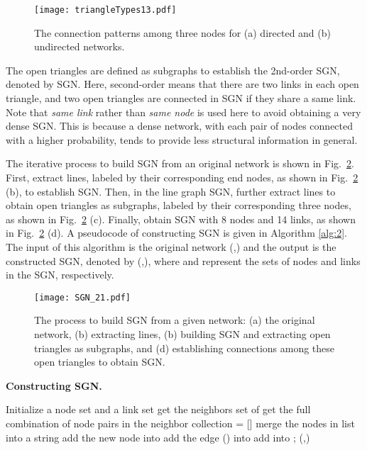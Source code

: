 \documentclass[10pt,journal,compsoc]{IEEEtran}
\begin{document}
\begin{figure}[!t]
	\centering
	\texttt{[image: triangleTypes13.pdf]}
	\caption{The connection patterns among three nodes for (a) directed and (b) undirected networks.}
	\label{fig:triangletypes}
\end{figure}

The open triangles are defined as subgraphs to establish the 2nd-order SGN, denoted by SGN. Here, second-order means that there are two links in each open triangle, and two open triangles are connected in SGN if they share a same link. Note that \emph{same link} rather than \emph{same node} is used here to avoid obtaining a very dense SGN. This is because a dense network, with each pair of nodes connected with a higher probability, tends to provide less structural information in general.

The iterative process to build SGN from an original network is shown in Fig.~\ref{fig:triangle}. First, extract lines, labeled by their corresponding end nodes, as shown in Fig.~\ref{fig:triangle} (b), to establish SGN. Then, in the line graph SGN, further extract lines to obtain open triangles as subgraphs, labeled by their corresponding three nodes, as shown in Fig.~\ref{fig:triangle} (c). Finally, obtain SGN with 8 nodes and 14 links, as shown in Fig.~\ref{fig:triangle} (d). A pseudocode of constructing SGN is given in Algorithm \ref{alg:2}. The input of this algorithm is the original network (,) and the output is the constructed SGN, denoted by (,), where  and  represent the sets of nodes and links in the SGN, respectively.

\begin{figure}[!t]
	\centering
	\texttt{[image: SGN\_21.pdf]}
	\caption{The process to build SGN from a given network: (a) the original network, (b) extracting lines, (b) building SGN and extracting open triangles as subgraphs, and (d) establishing connections among these open triangles to obtain SGN.}
	\label{fig:triangle}
\end{figure}

\begin{algorithm}[!t]
\caption{\textbf{Constructing SGN.}}
\label{alg:2}
Initialize a node set  and a link set \;
{
    get the neighbors set  of \;
      get the full combination of node pairs in the neighbor collection\;
        {
         = []\;
          merge the nodes in list  into a string\;
        add the new node  into \;}
        {add the edge () into  \;}
        add  into ;
}
\Return (,)\;
\end{algorithm}
\end{document}
